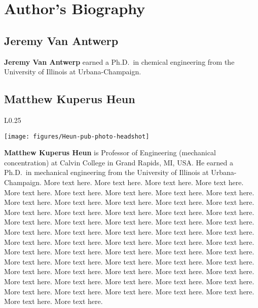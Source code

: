 

\chapter*{Author's Biography}


\section*{Jeremy Van Antwerp}

\textbf{Jeremy Van Antwerp} earned a Ph.D.\ in chemical engineering from 
the University of Illinois at Urbana-Champaign.


\section*{Matthew Kuperus Heun}

\setlength{\intextsep}{-7pt}%
\setlength{\columnsep}{8pt}%
\begin{wrapfigure}{L}{0.25\textwidth}
  \begin{center}
    \texttt{[image: figures/Heun-pub-photo-headshot]}
  \end{center}
\end{wrapfigure}
\textbf{Matthew Kuperus Heun} is Professor of Engineering 
(mechanical concentration)
at Calvin College in Grand Rapids, MI, USA.
He earned a Ph.D.\ in mechanical engineering from 
the University of Illinois at Urbana-Champaign.
More text here.
More text here.
More text here.
More text here.
More text here.
More text here.
More text here.
More text here.
More text here.
More text here.
More text here.
More text here.
More text here.
More text here.
More text here.
More text here.
More text here.
More text here.
More text here.
More text here.
More text here.
More text here.
More text here.
More text here.
More text here.
More text here.
More text here.
More text here.
More text here.
More text here.
More text here.
More text here.
More text here.
More text here.
More text here.
More text here.
More text here.
More text here.
More text here.
More text here.
More text here.
More text here.
More text here.
More text here.
More text here.
More text here.
More text here.
More text here.
More text here.
More text here.
More text here.
More text here.
More text here.
More text here.
More text here.
More text here.
More text here.
More text here.
More text here.
More text here.
More text here.

